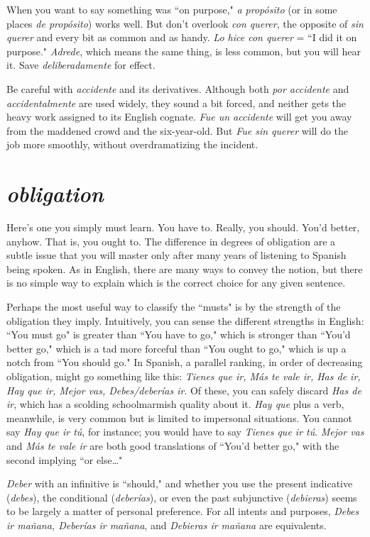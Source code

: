 When you want to say something was ``on purpose,"
\emph{a propósito} (or in some places \emph{de propósito}) works well. But don't overlook
\emph{con querer}, the opposite of \emph{sin querer} and every bit as common and
as handy. \emph{Lo hice con querer} = ``I did it on purpose." \emph{Adrede}, which
means the same thing, is less common, but you will hear it. Save \emph{deliberadamente} for effect.

Be careful with \emph{accidente} and its derivatives. Although both
\emph{por accidente} and \emph{accidentalmente} are used widely, they sound a bit
forced, and neither gets the heavy work assigned to its English cognate.
\emph{Fue un accidente} will get you away from the maddened crowd and the
six-year-old. But \emph{Fue sin querer} will do the job more smoothly, without overdramatizing the incident.

\section{\emph{obligation}}

Here's one you simply must learn. You have to. Really, you
should. You'd better, anyhow. That is, you ought to.
The difference in degrees of obligation are a subtle issue that
you will master only after many years of listening to Spanish being
spoken. As in English, there are many ways to convey the notion, but
there is no simple way to explain which is the correct choice for any
given sentence.

Perhaps the most useful way to classify the ``musts" is by the
strength of the obligation they imply. Intuitively, you can sense the
different strengths in English: ``You must go" is greater than ``You have
to go," which is stronger than ``You'd better go," which is a tad more
forceful than ``You ought to go," which is up a notch from ``You should
go." In Spanish, a parallel ranking, in order of decreasing obligation,
might go something like this: \emph{Tienes que ir, Más te vale ir, Has de ir,
	Hay que ir, Mejor vas, Debes/deberías ir}. Of these, you can safely discard \emph{Has de ir}, which has a scolding schoolmarmish quality about it.
\emph{Hay que} plus a verb, meanwhile, is very common but is limited to impersonal situations. You cannot say \emph{Hay que ir tú}, for instance; you
would have to say \emph{Tienes que ir tú}. \emph{Mejor vas} and \emph{Más te vale ir} are
both good translations of ``You'd better go," with the second implying
``or else\ldots{}"

\emph{Deber} with an infinitive is ``should," and whether you use the
present indicative (\emph{debes}), the conditional (\emph{deberías}), or even the past
subjunctive (\emph{debieras}) seems to be largely a matter of personal preference. For all intents and purposes, \emph{Debes ir mañana, Deberías ir mañana}, and \emph{Debieras ir mañana} are equivalents.

